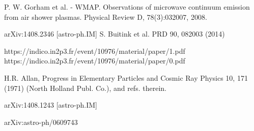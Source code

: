 \begin{thebibliography}{1}
 P. W. Gorham et al. - WMAP. Observations of microwave continuum emission from air shower plasmas. Physical Review D, 78(3):032007, 2008.

 
 arXiv:1408.2346 [astro-ph.IM]
 S. Buitink et al. PRD 90, 082003 (2014)

 https://indico.in2p3.fr/event/10976/material/paper/1.pdf
 https://indico.in2p3.fr/event/10976/material/paper/0.pdf

 H.R. Allan, Progress in Elementary Particles and Cosmic Ray Physics 10, 171 (1971) (North Holland Publ. Co.), and refs. therein.

 arXiv:1408.1243 [astro-ph.IM]

 arXiv:astro-ph/0609743


\end{thebibliography}
